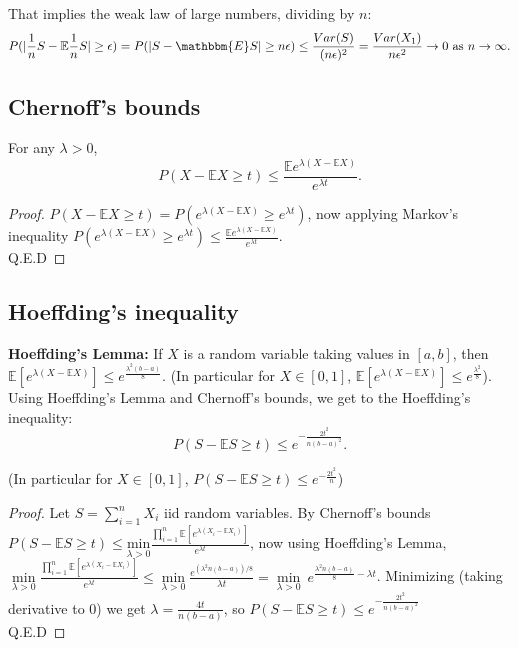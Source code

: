 \documentclass[11pt, english]{article}
\begin{document}
That implies the weak law of large numbers, dividing by $n$:
\begin{equation}
	P(|\frac{1}{n}S-\mathbb{E}\frac{1}{n}S|\geq \epsilon) = P(|S -\mathbbm{E}S| \geq n\epsilon)\leq\frac{Var(S)}{(n\epsilon)^2} = \frac{Var(X_1)}{n\epsilon^2} \rightarrow 0\text{ as }n\rightarrow\infty.
\end{equation} 



\subsection*{Chernoff's bounds}

For any $\lambda>0$,
\begin{equation}
	P(X-\mathbb{E}X\geq t)\leq\frac{\mathbb{E}e^{\lambda(X-\mathbb{E}X)}}{e^{\lambda t}}.
\end{equation} 
\begin{proof}
	$P(X-\mathbb{E}X\geq t)=P(e^{\lambda(X-\mathbb{E}X)}\geq e^{\lambda t})$, now applying Markov's inequality $P(e^{\lambda(X-\mathbb{E}X)}\geq e^{\lambda t})\leq \frac{\mathbb{E}e^{\lambda(X-\mathbb{E}X)}}{e^{\lambda t}}$. \\ Q.E.D
\end{proof}

\subsection*{Hoeffding's inequality}

\textbf{Hoeffding's Lemma:} If $X$ is a random variable taking values in $[a,b]$, then $\mathbb{E}[e^{\lambda(X-\mathbb{E}X)}]\leq e^{\frac{\lambda^2(b-a)}{8}}$.
(In particular for $X\in[0,1]$, $\mathbb{E}[e^{\lambda(X-\mathbb{E}X)}]\leq e^{\frac{\lambda^2}{8}}$).\\

Using Hoeffding's Lemma and Chernoff's bounds, we get to the Hoeffding's inequality:
\begin{equation}
	P(S-\mathbb{E}S\geq t)\leq e^{-\frac{2t^2}{n(b-a)^2}}.
\end{equation}

(In particular for $X\in[0,1]$, $P(S-\mathbb{E}S\geq t)\leq e^{-\frac{2t^2}{n}}$)

\begin{proof}
	Let $S = \sum_{i=1}^{n}X_i$ iid random variables. By Chernoff's bounds $P(S-\mathbb{E}S\geq t)\leq \underset{\lambda>0}{\text{min}}\frac{\prod\limits_{i=1}^n \mathbb{E}[e^{\lambda(X_i-\mathbb{E}X_i)}]}{e^{\lambda t}}$, now using Hoeffding's Lemma, $\underset{\lambda>0}{\min}\frac{\prod\limits_{i=1}^n \mathbb{E}[e^{\lambda(X_i-\mathbb{E}X_i)}]}{e^{\lambda t}}\leq \underset{\lambda>0}{\min}\frac{e^{(\lambda^2 n(b-a))/8}}{\lambda t}=\underset{\lambda>0}{\min}\ e^{\frac{\lambda^2n(b-a)}{8}-\lambda t}$. Minimizing (taking derivative to 0) we get $\lambda=\frac{4t}{n(b-a)}$, so $P(S-\mathbb{E}S\geq t)\leq e^{-\frac{2t^2}{n(b-a)^2}}$\\
	Q.E.D
\end{proof}
\end{document}
